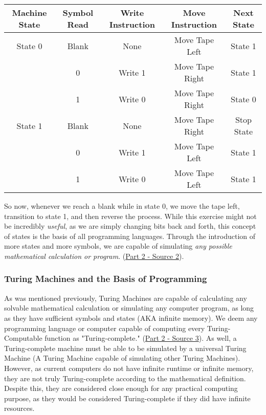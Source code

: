 \documentclass{article}
\begin{document}
        \begin{center}
    \begin{tabular}{||c c c c c|} 
    \hline
    Machine State & Symbol Read & Write Instruction & Move Instruction & Next State\\ [0.5ex] 
    \hline\hline
    State 0 & Blank & None & Move Tape Left & State 1\\ 
     \hline
     & 0 & Write 1 & Move Tape Right & State 1\\
     \hline
     & 1 & Write 0 & Move Tape Right & State 0\\
    \hline\hline
    State 1 & Blank & None & Move Tape Right & Stop State\\ 
     \hline
     & 0 & Write 1 & Move Tape Left & State 1\\
     \hline
     & 1 & Write 0 & Move Tape Left & State 1\\
    \hline
    \end{tabular}
    \end{center}
    So now, whenever we reach a blank while in state 0, we move the tape left, transition to state 1, and then reverse the process. While this exercise might not be incredibly \textit{useful}, as we are simply changing bits back and forth, this concept of states is the basis of all programming languages. Through the introduction of more states and more symbols, we are capable of simulating \textit{any possible mathematical calculation or program}. (\href {https://plato.stanford.edu/entries/turing-machine/}{Part 2 - Source 2}).
    
    \subsubsection{Turing Machines and the Basis of Programming}
    \medskip\noindent As was mentioned previously, Turing Machines are capable of calculating any solvable mathematical calculation or simulating any computer program, as long as they have sufficient symbols and states (AKA infinite memory). We deem any programming language or computer capable of computing every Turing-Computable function as "Turing-complete." (\href {https://chortle.ccsu.edu/StructuredC/Chap01/struct01_5.html}{Part 2 - Source 3}). As well, a Turing-complete machine must be able to be simulated by a universal Turing Machine (A Turing Machine capable of simulating other Turing Machines). However, as current computers do not have infinite runtime or infinite memory, they are not truly Turing-complete according to the mathematical definition. Despite this, they are considered close enough for any practical computing purpose, as they would be considered Turing-complete if they did have infinite resources. 
    
\end{document}

